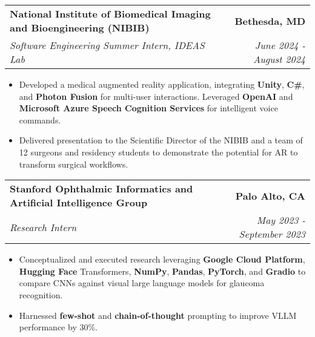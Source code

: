 \documentclass[letterpaper,11pt]{article}
\makeatletter
\newcommand{\resumeItem}[1]{
  \item\small{
    {#1 \vspace{-3pt}}
  }
}
\newcommand{\resumeSubheading}[4]{
  \vspace{-3pt}\item
    \begin{tabular*}{1.0\textwidth}[t]{l@{\extracolsep{\fill}}r}
      \textbf{#1} & \textbf{\small #2} \\
      \textit{\small#3} & \textit{\small #4} \\
    \end{tabular*}\vspace{-7pt}
}
\newcommand{\resumeSubheadingContinue}[2]{
  \vspace{-3pt}
    \begin{tabular*}{1.0\textwidth}[t]{l@{\extracolsep{\fill}}r}
      \textit{\small#1} & \textit{\small #2} \\
    \end{tabular*}\vspace{-7pt}
}
\newcommand{\resumeItemListStart}{\begin{itemize}}
\newcommand{\resumeItemListEnd}{\end{itemize}\vspace{0pt}}
\makeatother
\begin{document}
        \resumeSubheading
        {National Institute of Biomedical Imaging and Bioengineering (NIBIB)}{Bethesda, MD}
            {Software Engineering Summer Intern, IDEAS Lab}{June 2024 - August 2024}
            \resumeItemListStart
                \resumeItem{Developed a medical augmented reality application, integrating \textbf{Unity}, \textbf{C\#}, and \textbf{Photon Fusion} for multi-user interactions. Leveraged \textbf{OpenAI} and \textbf{Microsoft Azure Speech Cognition Services} for intelligent voice commands.}
                \resumeItem{Delivered presentation to the Scientific Director of the NIBIB and a team of 12 surgeons and residency students to demonstrate the potential for AR to transform surgical workflows.}
            \resumeItemListEnd


        \resumeSubheading
        {Stanford Ophthalmic Informatics and Artificial Intelligence Group}{Palo Alto, CA}
            {Research Intern}{May 2023 - September 2023}
            \resumeItemListStart
                \resumeItem{Conceptualized and executed research leveraging \textbf{Google Cloud Platform}, \textbf{Hugging Face} Transformers, \textbf{NumPy}, \textbf{Pandas}, \textbf{PyTorch}, and \textbf{Gradio} to compare CNNs against visual large language models for glaucoma recognition.}
                \resumeItem{Harnessed \textbf{few-shot} and \textbf{chain-of-thought} prompting to improve VLLM performance by 30\%.}
            \resumeItemListEnd
            
            
\end{document}
